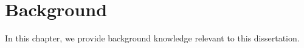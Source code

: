 \chapter{Background}
\label{chap:background}

In this chapter, we provide background knowledge relevant to this dissertation.






